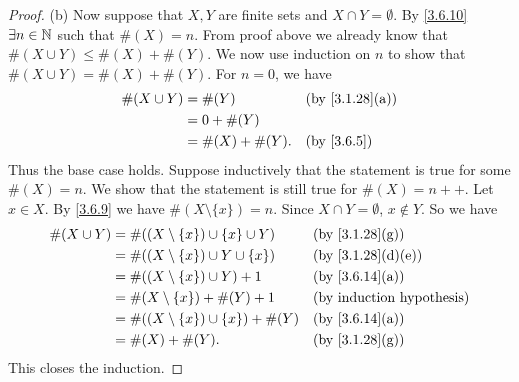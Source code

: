 \begin{proof}{(b)}
  Now suppose that \(X, Y\) are finite sets and \(X \cap Y = \emptyset\).
  By \cref{3.6.10} \(\exists n \in \mathbb{N}\) such that \(\#(X) = n\).
  From proof above we already know that \(\#(X \cup Y) \leq \#(X) + \#(Y)\).
  We now use induction on \(n\) to show that \(\#(X \cup Y) = \#(X) + \#(Y)\).
  For \(n = 0\), we have
  \begin{align*}
    \#(X \cup Y) & = \#(Y)          &  & \text{(by \cref{3.1.28}(a))} \\
                 & = 0 + \#(Y)                                        \\
                 & = \#(X) + \#(Y). &  & \by{3.6.5}
  \end{align*}
  Thus the base case holds.
  Suppose inductively that the statement is true for some \(\#(X) = n\).
  We show that the statement is still true for \(\#(X) = n++\).
  Let \(x \in X\).
  By \cref{3.6.9} we have \(\#(X \setminus \{x\}) = n\).
  Since \(X \cap Y = \emptyset\), \(x \notin Y\).
  So we have
  \begin{align*}
    \#(X \cup Y) & = \#((X \setminus \{x\}) \cup \{x\} \cup Y)  &  & \text{(by \cref{3.1.28}(g))}    \\
                 & = \#((X \setminus \{x\}) \cup Y \cup \{x\})  &  & \text{(by \cref{3.1.28}(d)(e))} \\
                 & = \#((X \setminus \{x\}) \cup Y) + 1         &  & \text{(by \cref{3.6.14}(a))}    \\
                 & = \#(X \setminus \{x\}) + \#(Y) + 1          &  & \byIH                           \\
                 & = \#((X \setminus \{x\}) \cup \{x\}) + \#(Y) &  & \text{(by \cref{3.6.14}(a))}    \\
                 & = \#(X) + \#(Y).                             &  & \text{(by \cref{3.1.28}(g))}
  \end{align*}
  This closes the induction.
\end{proof}

